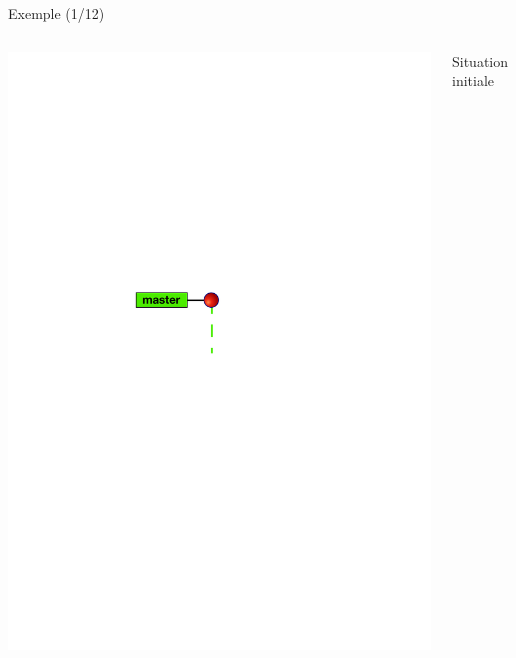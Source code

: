 \begin{frame}{%
\protect\hypertarget{exemple-112}{%
Exemple (1/12)}}

\begin{columns}[T]
\begin{column}{0.40\textwidth}
\includegraphics[width=1\textwidth]{images/branch1.pdf}
\end{column}

\begin{column}{0.60\textwidth}
Situation initiale
\end{column}
\end{columns}

\end{frame}

